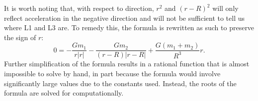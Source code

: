 It is worth noting that, with respect to direction, $r^2$ and $(r-R)^2$ will only reflect acceleration in the negative direction and will not be sufficient to tell us where L1 and L3 are.
To remedy this, the formula is rewritten as such to preserve the sign of $r$:
\begin{equation*}
	0 = -\frac{Gm_1}{r|r|} - \frac{Gm_2}{(r - R)|r - R|} + \frac{G(m_1+m_2)}{R^3}r \text{.}
\end{equation*}
Further simplification of the formula results in a rational function that is almost impossible to solve by hand, in part because the formula would involve significantly large values due to the constants used.
Instead, the roots of the formula are solved for computationally.
